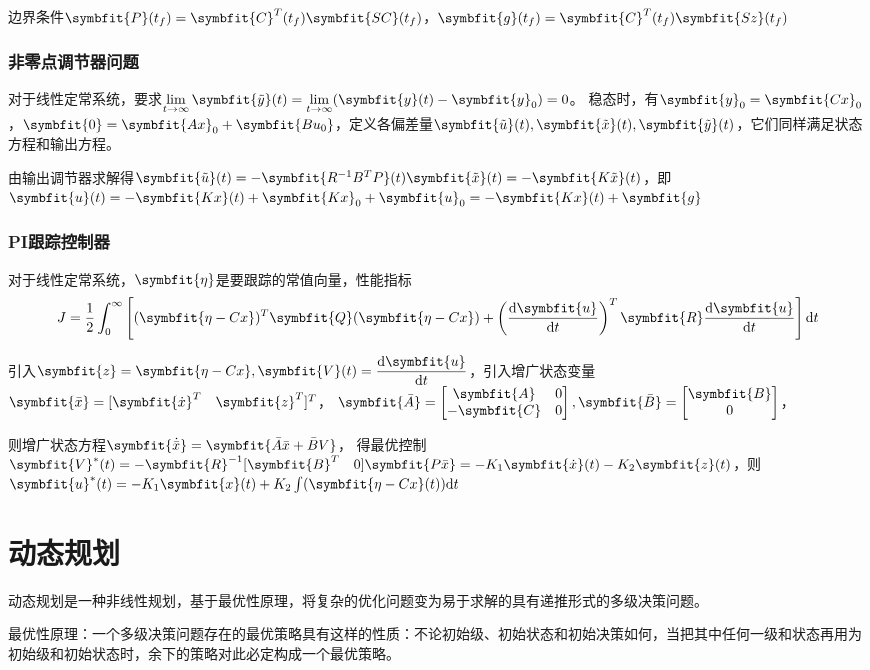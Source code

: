 \documentclass[11pt,a4paper]{ctexart}
\renewcommand{\d}{{\rm d}}
\newcommand{\bm}{\symbfit}
\begin{document}
            边界条件$\bm{P}(t_f)=\bm{C}^T(t_f)\bm{SC}(t_f)$，$\bm{g}(t_f)=\bm{C}^T(t_f)\bm{Sz}(t_f)$
        \subsubsection{非零点调节器问题}
            对于线性定常系统，要求$\lim\limits_{t\rightarrow\infty}\bm{\tilde y}(t)=\lim\limits_{t\rightarrow\infty}(\bm{y}(t)-\bm{y}_0)=0$。
            稳态时，有$\bm{y}_0=\bm{Cx}_0$，$\bm{0}=\bm{Ax}_0+\bm{Bu_0}$，定义各偏差量$\bm{\tilde u}(t),\bm{\tilde x}(t),\bm{\tilde y}(t)$，它们同样满足状态方程和输出方程。
            
            由输出调节器求解得$\bm{\tilde u}(t)=-\bm{R^{-1}B^T P}(t)\bm{\tilde x}(t)=-\bm{K\tilde x}(t)$，即$\bm{u}(t)=-\bm{Kx}(t)+\bm{Kx}_0+\bm{u}_0=-\bm{Kx}(t)+\bm{g}$
        \subsubsection{PI跟踪控制器}
            对于线性定常系统，$\bm{\eta}$是要跟踪的常值向量，性能指标
            \[
            J=\dfrac12\int_{0}^{\infty}\left[(\bm{\eta-Cx})^T\bm{Q}(\bm{\eta-Cx})+\left(\dfrac{\d\bm{u}}{\d t}\right)^T\bm{R}\dfrac{\d\bm{u}}{\d t}\right]\d t
            \]

            引入$\bm{z}=\bm{\eta-Cx},\bm{V}(t)=\dfrac{\d\bm{u}}{\d t}$，引入增广状态变量$\bm{\bar x}=[\bm{\dot x}^T\quad\bm{z}^T]^T$，
            $\bm{\bar A}=\begin{bmatrix}\bm{A}& 0\\-\bm{C}& 0\end{bmatrix},\bm{\bar B}=\begin{bmatrix}\bm{B}\\0\end{bmatrix}$，
            
            则增广状态方程$\bm{\dot{\bar x}}=\bm{\bar A\bar x+\bar B V}$，
            得最优控制$\bm{V}^*(t)=-\bm{R}^{-1}[\bm{B}^T\quad 0]\bm{P\bar x}=-K_1\bm{\dot x}(t)-K_2\bm{z}(t)$，则$\bm{u}^*(t)=-K_1\bm{x}(t)+K_2\int(\bm{\eta-Cx}(t))\d t$
\newpage
\section{动态规划}
    动态规划是一种非线性规划，基于最优性原理，将复杂的优化问题变为易于求解的具有递推形式的多级决策问题。

    最优性原理：一个多级决策问题存在的最优策略具有这样的性质：不论初始级、初始状态和初始决策如何，当把其中任何一级和状态再用为初始级和初始状态时，余下的策略对此必定构成一个最优策略。
\end{document}
